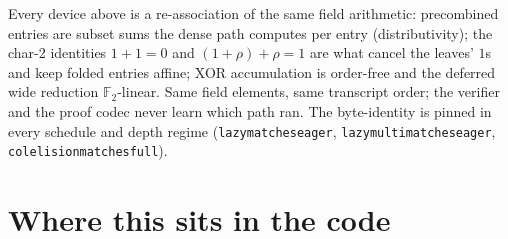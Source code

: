 \documentclass[11pt]{article}
\newcommand{\F}{\mathbb{F}}
\newcommand{\Ftwo}{\F_2}
\newcommand{\code}[1]{{\def\_{\textunderscore\allowbreak}\texttt{#1}}}
\theoremstyle{definition}
\begin{document}
Every device above is a re-association of the same field arithmetic:
precombined entries are subset sums the dense path computes per entry
(distributivity); the char-2 identities $1 + 1 = 0$ and
$(1{+}\rho) + \rho = 1$ are what cancel the leaves' $1$s and keep folded
entries affine; XOR accumulation is order-free and the deferred wide
reduction $\Ftwo$-linear.  Same field elements, same transcript order;
the verifier and the proof codec never learn which path ran.  The
byte-identity is pinned in every schedule and depth regime
(\code{lazy\_matches\_eager}, \code{lazy\_multi\_matches\_eager},
\code{col\_elision\_matches\_full}).

\section{Where this sits in the code}
\label{sec:code}
\end{document}
